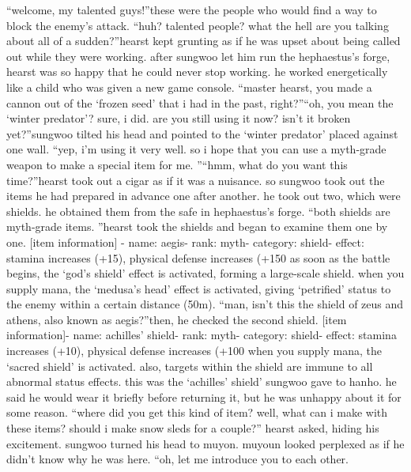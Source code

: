 “welcome, my talented guys!”these were the people who would find a way to block the enemy’s attack.
“huh? talented people? what the hell are you talking about all of a sudden?”hearst kept grunting as if he was upset about being called out while they were working.
after sungwoo let him run the hephaestus’s forge, hearst was so happy that he could never stop working.
 he worked energetically like a child who was given a new game console.
“master hearst, you made a cannon out of the ‘frozen seed’ that i had in the past, right?”“oh, you mean the ‘winter predator’? sure, i did.
 are you still using it now? isn’t it broken yet?”sungwoo tilted his head and pointed to the ‘winter predator’ placed against one wall.
“yep, i’m using it very well.
 so i hope that you can use a myth-grade weapon to make a special item for me.
”“hmm, what do you want this time?”hearst took out a cigar as if it was a nuisance.
so sungwoo took out the items he had prepared in advance one after another.
he took out two, which were shields.
 he obtained them from the safe in hephaestus’s forge.
“both shields are myth-grade items.
”hearst took the shields and began to examine them one by one.
[item information]
- name: aegis- rank: myth- category: shield- effect: stamina increases (+15), physical defense increases (+150%
 as soon as the battle begins, the ‘god’s shield’ effect is activated, forming a large-scale shield.
 when you supply mana, the ‘medusa’s head’ effect is activated, giving ‘petrified’ status to the enemy within a certain distance (50m).
“man, isn’t this the shield of zeus and athens, also known as aegis?”then, he checked the second shield.
[item information]- name: achilles’ shield- rank: myth- category: shield- effect: stamina increases (+10), physical defense increases (+100%
 when you supply mana, the ‘sacred shield’ is activated.
 also, targets within the shield are immune to all abnormal status effects.
this was the ‘achilles’ shield’ sungwoo gave to hanho.
 he said he would wear it briefly before returning it, but he was unhappy about it for some reason.
“where did you get this kind of item? well, what can i make with these items? should i make snow sleds for a couple?” hearst asked, hiding his excitement.
sungwoo turned his head to muyon.
 muyoun looked perplexed as if he didn’t know why he was here.
“oh, let me introduce you to each other.
